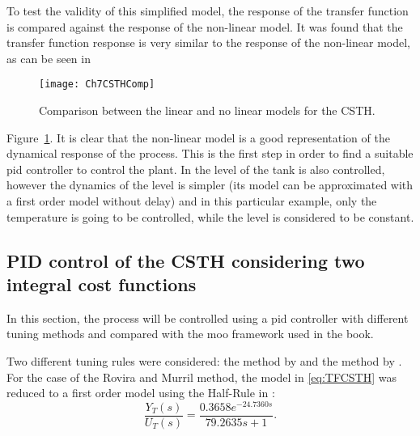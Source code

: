 To test the validity of this simplified model, the response of the transfer function is compared against the response of the non-linear model. It was found that the transfer function response is very similar to the response of the non-linear model, as can be seen in %
%
\begin{figure}[tb]
	\centering
	\texttt{[image: Ch7CSTHComp]}
	\caption{Comparison between the linear and no linear models for the CSTH.}
	\label{fig:Ch7CSTHComp}
\end{figure}
%
Figure~\ref{fig:Ch7CSTHComp}. It is clear that the non-linear model is a good representation of the dynamical response of the process. This is the first step in order to find a suitable \gls{pid} controller to control the plant. In \citet{Alfaro2016} the level of the tank is also controlled, however the dynamics of the level is simpler (its model can be approximated with a first order model without delay) and in this particular example, only the temperature is going to be controlled, while the level is considered to be constant.
%
\subsection{PID control of the CSTH considering two integral cost functions}
\label{sec:PIDCSTH}
In this section, the process will be controlled using a \gls{pid} controller with different tuning methods and compared with the \gls{moo} framework used in the book.

Two different tuning rules were considered: the method by \citet{Rovira1969a} and the method by \citet{Murril1967}. For the case of the Rovira and Murril method, the model in \eqref{eq:TFCSTH} was reduced to a first order model using the Half-Rule in \citet{Skogestad2003}:
\begin{equation}
\frac{Y_T(s)}{U_T(s)} = \frac{0.3658 e^{-24.7360 s}}{79.2635 s +1}.
\label{eq:TFCSTHFirstOrder}
\end{equation}

